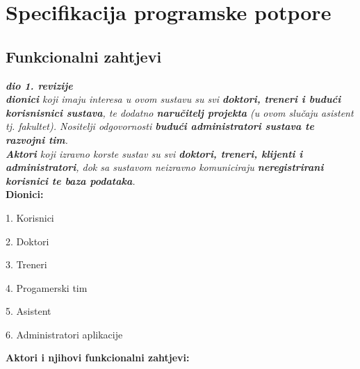 \chapter{Specifikacija programske potpore}
		
	\section{Funkcionalni zahtjevi}
			
			\textbf{\textit{dio 1. revizije}}\\
			
			\textit{ \textbf{dionici} koji imaju interesa u ovom sustavu su svi \textbf{doktori, treneri i budući korisnisnici sustava},
			te dodatno \textbf{naručitelj projekta} (u ovom slučaju asistent tj. fakultet). Nositelji odgovornosti \textbf{budući administratori sustava te razvojni tim}.}\\
				
			\textit{\textbf{Aktori} koji izravno korste sustav su svi \textbf{doktori, treneri, klijenti i administratori}, dok sa sustavom neizravno komuniciraju \textbf{neregistrirani korisnici te baza podataka}.}\\
			
			
			\noindent \textbf{Dionici:}
			
			\begin{packed_enum}
				
				\item 1. Korisnici
				\item 2. Doktori			
				\item 3. Treneri
				\item 4. Progamerski tim 
				\item 5. Asistent
				\item 6. Administratori aplikacije
				
			\end{packed_enum}
			
			\noindent \textbf{Aktori i njihovi funkcionalni zahtjevi:}
			
